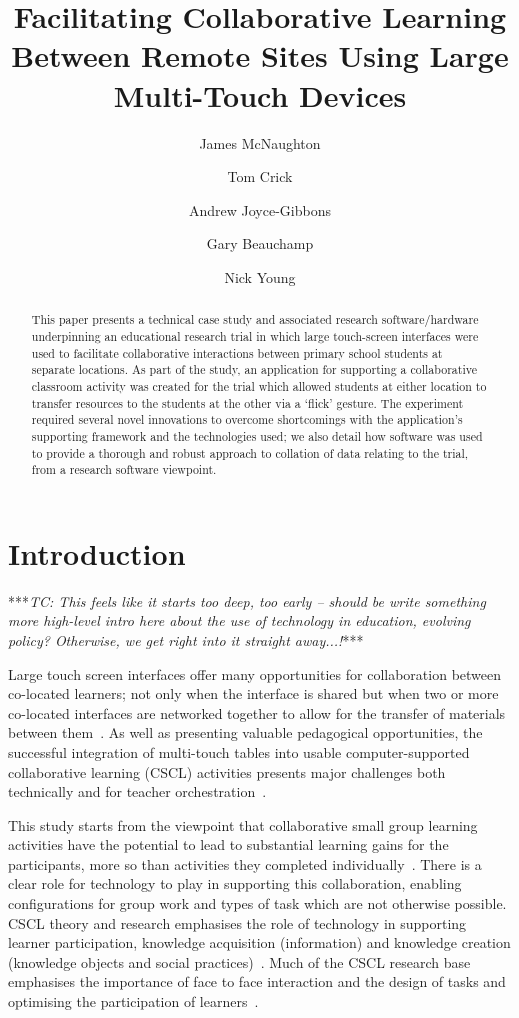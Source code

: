 \documentclass[a4paper,11pt]{article}
\title{Facilitating Collaborative Learning Between Remote Sites Using Large Multi-Touch Devices}
\author[1]{James McNaughton}
\author[2]{Tom Crick}
\author[3]{Andrew Joyce-Gibbons}
\author[4]{Gary Beauchamp}
\author[5]{Nick Young}
\affil[1,3]{School of Education, Durham University, UK}
\affil[2]{Department of Computing \& Information Systems, Cardiff
  Metropolitan University, UK}
\affil[4,5]{School of Education, Cardiff Metropolitan University, UK}
\affil[1]{\protect\url{j.a.mcnaughton@durham.ac.uk}}
\affil[2]{\protect\url{tcrick@cardiffmet.ac.uk}}
\affil[3]{\protect\url{andrew.joyce-gibbons@durham.ac.uk}}
\affil[4]{\protect\url{gbeauchamp@cardiffmet.ac.uk}}
\affil[5]{\protect\url{nyoung@cardiffmet.ac.uk}}
\date{ }
\begin{document}
\maketitle

\begin{abstract}
This paper presents a technical case study and associated research software/hardware underpinning an educational research trial in which large touch-screen interfaces were used to facilitate collaborative interactions between primary school students at separate locations.
As part of the study, an application for supporting a collaborative classroom activity was created for the trial which allowed students at either location to transfer resources to the students at the other via a `flick' gesture.
The experiment required several novel innovations to overcome shortcomings with the application's supporting framework and the technologies used; we also detail how software was used to provide a thorough and robust approach to collation of data relating to the trial, from a research software viewpoint.
\end{abstract}

\section{Introduction}

***{\emph{TC: This feels like it starts too deep, too early -- should be write something more high-level intro here about the use of technology in education, evolving policy? Otherwise, we get right into it straight away...!}}***

Large touch screen interfaces offer many opportunities for collaboration between co-located learners; not only when the interface is shared but when two or more co-located interfaces are networked together to allow for the transfer of materials between them~\cite{kharrufa:2013,kreitmayer:2013}.
As well as presenting valuable pedagogical opportunities, the successful integration of multi-touch tables into usable computer-supported collaborative learning (CSCL) activities presents major challenges both technically and for teacher orchestration~\cite{dillenbourg:2011}. 

This study starts from the viewpoint that collaborative small group learning activities have the potential to lead to substantial learning gains for the participants, more so than activities they completed individually~\cite{odonnell:2013,barron:2008}.
There is a clear role for technology to play in supporting this collaboration, enabling configurations for group work and types of task which are not otherwise possible.
CSCL theory and research emphasises the role of technology in supporting learner participation, knowledge acquisition (information) and knowledge creation (knowledge objects and social practices)~\cite{lipponen:2004}.
Much of the CSCL research base emphasises the importance of face to face interaction and the design of tasks and optimising the participation of learners~\cite{stahl:2014}.
\end{document}
